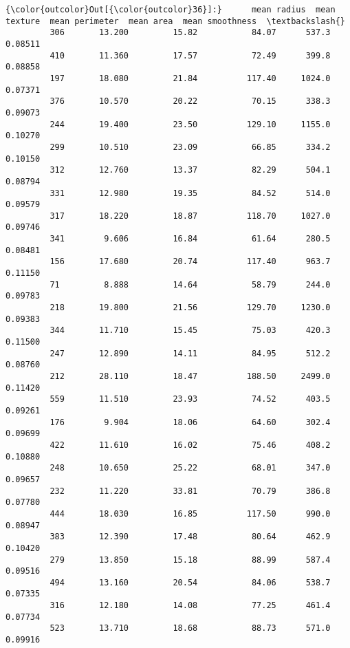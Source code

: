 \documentclass[11pt]{article}
\begin{document}
\begin{Verbatim}[commandchars=\\\{\}]
{\color{outcolor}Out[{\color{outcolor}36}]:}      mean radius  mean texture  mean perimeter  mean area  mean smoothness  \textbackslash{}
         306       13.200         15.82           84.07      537.3          0.08511   
         410       11.360         17.57           72.49      399.8          0.08858   
         197       18.080         21.84          117.40     1024.0          0.07371   
         376       10.570         20.22           70.15      338.3          0.09073   
         244       19.400         23.50          129.10     1155.0          0.10270   
         299       10.510         23.09           66.85      334.2          0.10150   
         312       12.760         13.37           82.29      504.1          0.08794   
         331       12.980         19.35           84.52      514.0          0.09579   
         317       18.220         18.87          118.70     1027.0          0.09746   
         341        9.606         16.84           61.64      280.5          0.08481   
         156       17.680         20.74          117.40      963.7          0.11150   
         71         8.888         14.64           58.79      244.0          0.09783   
         218       19.800         21.56          129.70     1230.0          0.09383   
         344       11.710         15.45           75.03      420.3          0.11500   
         247       12.890         14.11           84.95      512.2          0.08760   
         212       28.110         18.47          188.50     2499.0          0.11420   
         559       11.510         23.93           74.52      403.5          0.09261   
         176        9.904         18.06           64.60      302.4          0.09699   
         422       11.610         16.02           75.46      408.2          0.10880   
         248       10.650         25.22           68.01      347.0          0.09657   
         232       11.220         33.81           70.79      386.8          0.07780   
         444       18.030         16.85          117.50      990.0          0.08947   
         383       12.390         17.48           80.64      462.9          0.10420   
         279       13.850         15.18           88.99      587.4          0.09516   
         494       13.160         20.54           84.06      538.7          0.07335   
         316       12.180         14.08           77.25      461.4          0.07734   
         523       13.710         18.68           88.73      571.0          0.09916   

\end{Verbatim}
\end{document}
